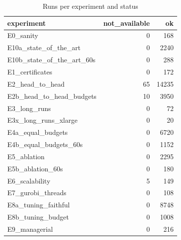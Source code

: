 \begin{table}[htbp]
\centering
\small
\caption{Runs per experiment and status}
\label{tab:campaign_status}
\begin{tabular}{lrr}
\toprule
experiment & not\_available & ok \\
\midrule
E0\_sanity & 0 & 168 \\
E10a\_state\_of\_the\_art & 0 & 2240 \\
E10b\_state\_of\_the\_art\_60s & 0 & 288 \\
E1\_certificates & 0 & 172 \\
E2\_head\_to\_head & 65 & 14235 \\
E2b\_head\_to\_head\_budgets & 10 & 3950 \\
E3\_long\_runs & 0 & 72 \\
E3x\_long\_runs\_xlarge & 0 & 20 \\
E4a\_equal\_budgets & 0 & 6720 \\
E4b\_equal\_budgets\_60s & 0 & 1152 \\
E5\_ablation & 0 & 2295 \\
E5b\_ablation\_60s & 0 & 180 \\
E6\_scalability & 5 & 149 \\
E7\_gurobi\_threads & 0 & 108 \\
E8a\_tuning\_faithful & 0 & 8748 \\
E8b\_tuning\_budget & 0 & 1008 \\
E9\_managerial & 0 & 216 \\
\bottomrule
\end{tabular}
\end{table}

